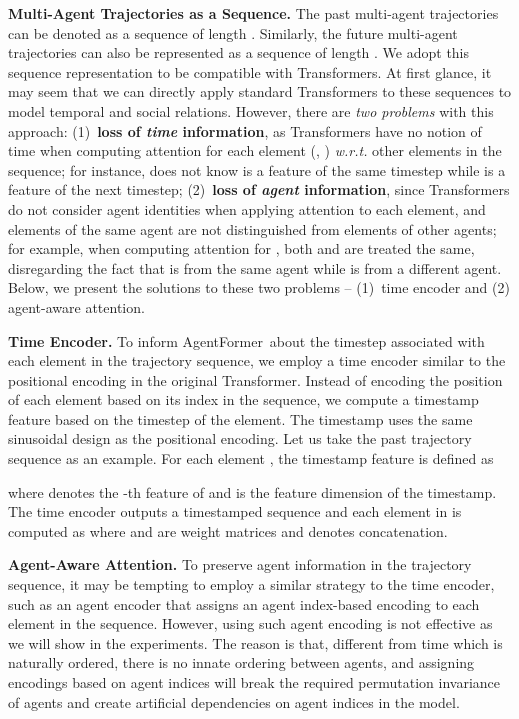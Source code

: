 \documentclass[10pt,twocolumn,letterpaper]{article}
\newcommand{\mname}{AgentFormer}
\begin{document}
\vspace{2mm}
\noindent\textbf{Multi-Agent Trajectories as a Sequence.}
The past multi-agent trajectories  can be denoted as a sequence  of length . Similarly, the future multi-agent trajectories can also be represented as a sequence  of length . We adopt this sequence representation to be compatible with Transformers. At first glance, it may seem that we can directly apply standard Transformers to these sequences to model temporal and social relations. However, there are \emph{two problems} with this approach:
(1)~\textbf{loss of \emph{time} information}, as Transformers have no notion of time when computing attention for each element (\eg, ) \emph{w.r.t.} other elements in the sequence; for instance,  does not know  is a feature of the same timestep while  is a feature of the next timestep;
(2)~\textbf{loss of \emph{agent} information}, since Transformers do not consider agent identities when applying attention to each element, and elements of the same agent are not distinguished from elements of other agents; for example, when computing attention for , both  and  are treated the same, disregarding the fact that  is from the same agent while  is from a different agent. Below, we present the solutions to these two problems -- (1)~time encoder and (2) agent-aware attention.

\vspace{2mm}
\noindent\textbf{Time Encoder.} To inform \mname\ about the timestep associated with each element in the trajectory sequence, we employ a time encoder similar to the positional encoding in the original Transformer. Instead of encoding the position of each element based on its index in the sequence, we compute a timestamp feature based on the timestep  of the element. The timestamp uses the same sinusoidal design as the positional encoding. Let us take the past trajectory sequence  as an example. For each element , the timestamp feature  is defined as

where  denotes the -th feature of  and  is the feature dimension of the timestamp. The time encoder outputs a timestamped sequence  and each element  in  is computed as  where  and  are weight matrices and  denotes concatenation.

\vspace{2mm}
\noindent\textbf{Agent-Aware Attention.} To preserve agent information in the trajectory sequence, it may be tempting to employ a similar strategy to the time encoder, such as an agent encoder that assigns an agent index-based encoding to each element in the sequence. However, using such agent encoding is not effective as we will show in the experiments. The reason is that, different from time which is naturally ordered, there is no innate ordering between agents, and assigning encodings based on agent indices will break the required permutation invariance of agents and create artificial dependencies on agent indices in the model.
\end{document}
